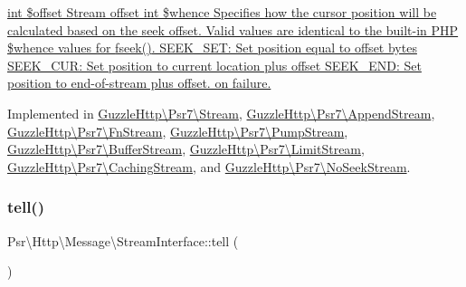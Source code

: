 \hyperlink{}{int \$offset Stream offset  int \$whence Specifies how the cursor position will be calculated based on the seek offset. Valid values are identical to the built-\/in P\+HP \$whence values for {\ttfamily fseek()}. S\+E\+E\+K\+\_\+\+S\+E\+T\+: Set position equal to offset bytes S\+E\+E\+K\+\_\+\+C\+U\+R\+: Set position to current location plus offset S\+E\+E\+K\+\_\+\+E\+N\+D\+: Set position to end-\/of-\/stream plus offset.   on failure. }

Implemented in \hyperlink{classGuzzleHttp_1_1Psr7_1_1Stream_abf9d99bb0f70f34723dbfeb80678ad79}{Guzzle\+Http\textbackslash{}\+Psr7\textbackslash{}\+Stream}, \hyperlink{classGuzzleHttp_1_1Psr7_1_1AppendStream_a12cffae90d6bbee5c8ceecc0b27f9a43}{Guzzle\+Http\textbackslash{}\+Psr7\textbackslash{}\+Append\+Stream}, \hyperlink{classGuzzleHttp_1_1Psr7_1_1FnStream_ae1f0b15fdfdf1e432c66ed01127cb01a}{Guzzle\+Http\textbackslash{}\+Psr7\textbackslash{}\+Fn\+Stream}, \hyperlink{classGuzzleHttp_1_1Psr7_1_1PumpStream_a9245d47aa4ba82439759d407115e4c5a}{Guzzle\+Http\textbackslash{}\+Psr7\textbackslash{}\+Pump\+Stream}, \hyperlink{classGuzzleHttp_1_1Psr7_1_1BufferStream_a0ac3c779324ec9a9534519f71aab5ad0}{Guzzle\+Http\textbackslash{}\+Psr7\textbackslash{}\+Buffer\+Stream}, \hyperlink{classGuzzleHttp_1_1Psr7_1_1LimitStream_aa1230441e4a3ce17b63330b43f2b038b}{Guzzle\+Http\textbackslash{}\+Psr7\textbackslash{}\+Limit\+Stream}, \hyperlink{classGuzzleHttp_1_1Psr7_1_1CachingStream_a6ae3ecc8a3a8073639793e81431a4a83}{Guzzle\+Http\textbackslash{}\+Psr7\textbackslash{}\+Caching\+Stream}, and \hyperlink{classGuzzleHttp_1_1Psr7_1_1NoSeekStream_a615df46cc187cca2b0f9ffac86a1d83e}{Guzzle\+Http\textbackslash{}\+Psr7\textbackslash{}\+No\+Seek\+Stream}.

\mbox{\label{interfacePsr_1_1Http_1_1Message_1_1StreamInterface_a9aa2f88a38f496d74100f42ddf0656ef}} 
\subsubsection{\texorpdfstring{tell()}{tell()}}
{\footnotesize\ttfamily Psr\textbackslash{}\+Http\textbackslash{}\+Message\textbackslash{}\+Stream\+Interface\+::tell (\begin{DoxyParamCaption}{ }\end{DoxyParamCaption})}

